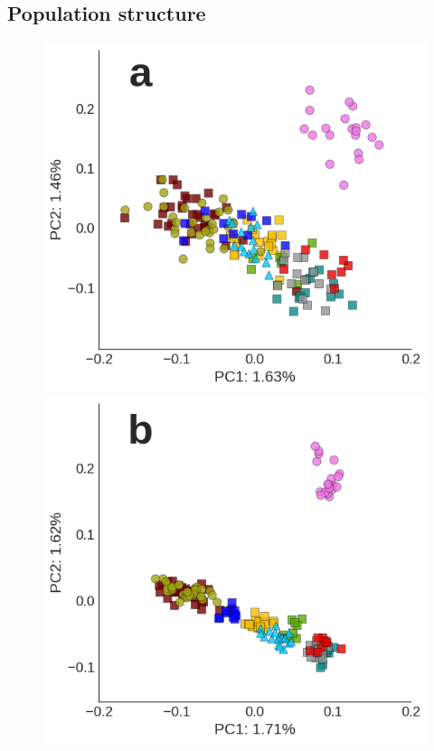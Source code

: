 \documentclass[12pt, one column]{article}
\begin{document}
\subsection*{Population structure}
\begin{figure}[H]
\includegraphics[scale=.35]{figures/PCA_a.png}
\includegraphics[scale=.35]{figures/PCA_b.png}

\end{figure}
\end{document}

